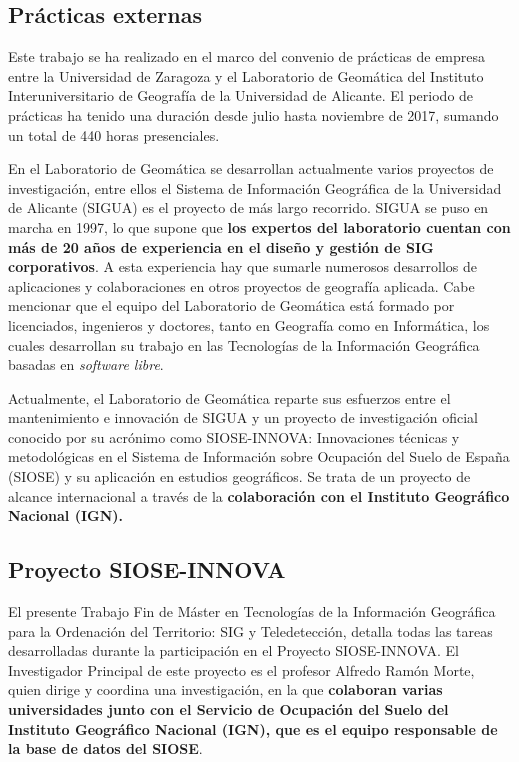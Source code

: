 
\begin{prologo}

\subsection*{Prácticas externas}
Este trabajo se ha realizado en el marco del convenio de prácticas de empresa entre la Universidad de Zaragoza y el Laboratorio de Geomática del Instituto Interuniversitario de Geografía de la Universidad de Alicante. El periodo de prácticas ha tenido una duración desde julio hasta noviembre de 2017, sumando un total de 440 horas presenciales.

En el Laboratorio de Geomática se desarrollan actualmente varios proyectos de investigación, entre ellos el Sistema de Información Geográfica de la Universidad de Alicante (SIGUA) es el proyecto de más largo recorrido. SIGUA se puso en marcha en 1997, lo que supone que \textbf{los expertos del laboratorio cuentan con más de 20 años de experiencia en el diseño y gestión de SIG corporativos}. A esta experiencia hay que sumarle numerosos desarrollos de aplicaciones y colaboraciones en otros proyectos de geografía aplicada. Cabe mencionar que el equipo del Laboratorio de Geomática está formado por licenciados, ingenieros y doctores, tanto en Geografía como en Informática, los cuales desarrollan su trabajo en las Tecnologías de la Información Geográfica basadas en \textit{software libre}.

Actualmente, el Laboratorio de Geomática reparte sus esfuerzos entre el mantenimiento e innovación de SIGUA y un proyecto de investigación oficial conocido por su acrónimo como SIOSE-INNOVA: Innovaciones técnicas y metodológicas en el Sistema de Información sobre Ocupación del Suelo de España (SIOSE) y su aplicación en estudios geográficos. Se trata de un proyecto de alcance internacional a través de la \textbf{colaboración con el Instituto Geográfico Nacional (IGN).}

\subsection*{Proyecto SIOSE-INNOVA}
El presente Trabajo Fin de Máster en Tecnologías de la Información Geográfica para la Ordenación del Territorio: SIG y Teledetección, detalla todas las tareas desarrolladas durante la participación en el Proyecto SIOSE-INNOVA. El Investigador Principal de este proyecto es el profesor Alfredo Ramón Morte, quien dirige y coordina una investigación, en la que \textbf{colaboran varias universidades junto con el  Servicio de Ocupación del Suelo del Instituto Geográfico Nacional (IGN), que es el equipo responsable de la base de datos del SIOSE}.


\end{prologo}
